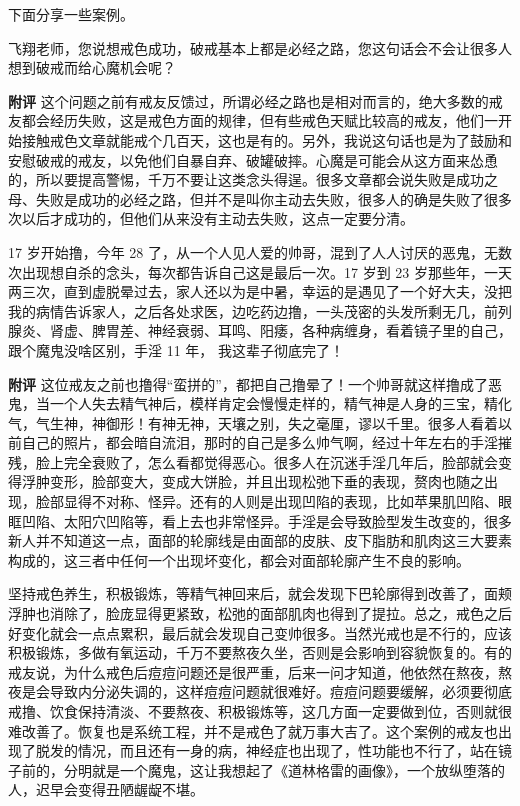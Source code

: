 下面分享一些案例。

\begin{case}
    飞翔老师，您说想戒色成功，破戒基本上都是必经之路，您这句话会不会让很多人想到破戒而给心魔机会呢？

    \textbf{附评} 这个问题之前有戒友反馈过，所谓必经之路也是相对而言的，绝大多数的戒友都会经历失败，这是戒色方面的规律，但有些戒色天赋比较高的戒友，他们一开始接触戒色文章就能戒个几百天，这也是有的。另外，我说这句话也是为了鼓励和安慰破戒的戒友，以免他们自暴自弃、破罐破摔。心魔是可能会从这方面来怂恿的，所以要提高警惕，千万不要让这类念头得逞。很多文章都会说失败是成功之母、失败是成功的必经之路，但并不是叫你主动去失败，很多人的确是失败了很多次以后才成功的，但他们从来没有主动去失败，这点一定要分清。
\end{case}

\begin{case}
    17 岁开始撸，今年 28 了，从一个人见人爱的帅哥，混到了人人讨厌的恶鬼，无数次出现想自杀的念头，每次都告诉自己这是最后一次。17 岁到 23 岁那些年，一天两三次，直到虚脱晕过去，家人还以为是中暑，幸运的是遇见了一个好大夫，没把我的病情告诉家人，之后各处求医，边吃药边撸，一头茂密的头发所剩无几，前列腺炎、肾虚、脾胃差、神经衰弱、耳鸣、阳痿，各种病缠身，看着镜子里的自己，跟个魔鬼没啥区别，手淫 11 年， 我这辈子彻底完了！

    \textbf{附评} 这位戒友之前也撸得“蛮拼的”，都把自己撸晕了！一个帅哥就这样撸成了恶鬼，当一个人失去精气神后，模样肯定会慢慢走样的，精气神是人身的三宝，精化气，气生神，神御形！有神无神，天壤之别，失之毫厘，谬以千里。很多人看着以前自己的照片，都会暗自流泪，那时的自己是多么帅气啊，经过十年左右的手淫摧残，脸上完全衰败了，怎么看都觉得恶心。很多人在沉迷手淫几年后，脸部就会变得浮肿变形，脸部变大，变成大饼脸，并且出现松弛下垂的表现，赘肉也随之出现，脸部显得不对称、怪异。还有的人则是出现凹陷的表现，比如苹果肌凹陷、眼眶凹陷、太阳穴凹陷等，看上去也非常怪异。手淫是会导致脸型发生改变的，很多新人并不知道这一点，面部的轮廓线是由面部的皮肤、皮下脂肪和肌肉这三大要素构成的，这三者中任何一个出现坏变化，都会对面部轮廓产生不良的影响。

    坚持戒色养生，积极锻炼，等精气神回来后，就会发现下巴轮廓得到改善了，面颊浮肿也消除了，脸庞显得更紧致，松弛的面部肌肉也得到了提拉。总之，戒色之后好变化就会一点点累积，最后就会发现自己变帅很多。当然光戒也是不行的，应该积极锻炼，多做有氧运动，千万不要熬夜久坐，否则是会影响到容貌恢复的。有的戒友说，为什么戒色后痘痘问题还是很严重，后来一问才知道，他依然在熬夜，熬夜是会导致内分泌失调的，这样痘痘问题就很难好。痘痘问题要缓解，必须要彻底戒撸、饮食保持清淡、不要熬夜、积极锻炼等，这几方面一定要做到位，否则就很难改善了。恢复也是系统工程，并不是戒色了就万事大吉了。这个案例的戒友也出现了脱发的情况，而且还有一身的病，神经症也出现了，性功能也不行了，站在镜子前的，分明就是一个魔鬼，这让我想起了《道林格雷的画像》，一个放纵堕落的人，迟早会变得丑陋龌龊不堪。
\end{case}

